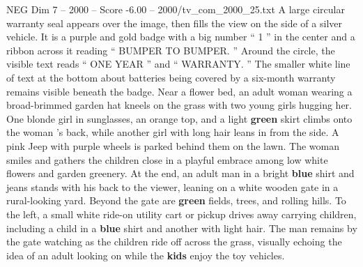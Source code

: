 \begin{textsample}{NEG Dim 7 – 2000 – Score -6.00 – 2000/tv\_com\_2000\_25.txt}
A large circular warranty seal appears over the image, then fills the view on the side of a silver vehicle.
It is a purple and gold badge with a big number “ 1 ” in the center and a ribbon across it reading “ BUMPER TO BUMPER. ” Around the circle, the visible text reads “ ONE YEAR ” and “ WARRANTY. ” The smaller white line of text at the bottom about batteries being covered by a six-month warranty remains visible beneath the badge.
Near a flower bed, an adult woman wearing a broad-brimmed garden hat kneels on the grass with two young girls hugging her.
One blonde girl in sunglasses, an orange top, and a light \textbf{green} skirt climbs onto the woman ’s back, while another girl with long hair leans in from the side.
A pink Jeep with purple wheels is parked behind them on the lawn.
The woman smiles and gathers the children close in a playful embrace among low white flowers and garden greenery.
At the end, an adult man in a bright \textbf{blue} shirt and jeans stands with his back to the viewer, leaning on a white wooden gate in a rural-looking yard.
Beyond the gate are \textbf{green} fields, trees, and rolling hills.
To the left, a small white ride-on utility cart or pickup drives away carrying children, including a child in a \textbf{blue} shirt and another with light hair.
The man remains by the gate watching as the children ride off across the grass, visually echoing the idea of an adult looking on while the \textbf{kids} enjoy the toy vehicles.

\end{textsample}
